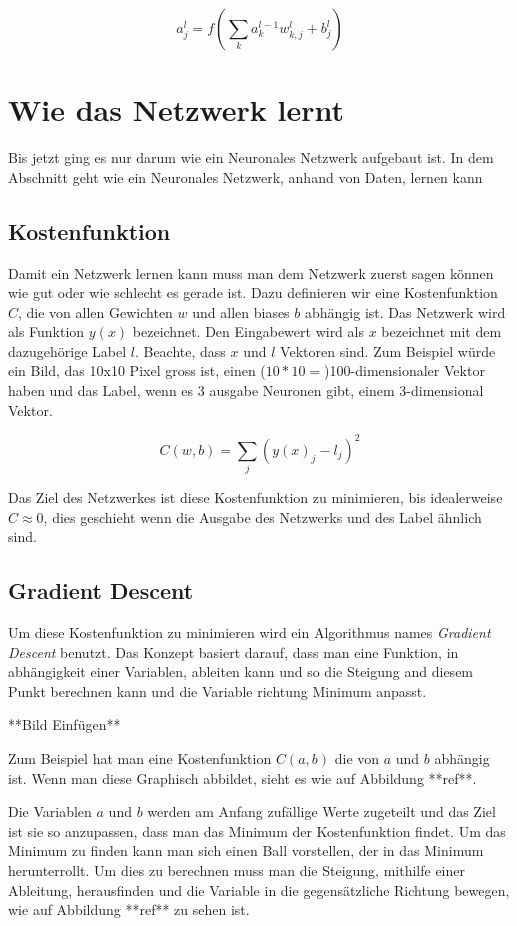 \documentclass[12pt,a4paper]{report}
\begin{document}
\[a^l_j = f\left(\sum_{k} a^{l-1}_k w^l_{k,j} + b^l_j\right)\]

\section{Wie das Netzwerk lernt}\label{sec:lernen}
Bis jetzt ging es nur darum wie ein Neuronales Netzwerk aufgebaut ist.
In dem Abschnitt geht wie ein Neuronales Netzwerk, anhand von Daten, lernen kann
\subsection{Kostenfunktion}
Damit ein Netzwerk lernen kann muss man dem Netzwerk zuerst sagen können wie gut oder wie schlecht es gerade ist.
Dazu definieren wir eine Kostenfunktion $C$, die von allen Gewichten $w$ und allen biases $b$ abhängig ist.
Das Netzwerk wird als Funktion $y(x)$ bezeichnet.
Den Eingabewert wird als $x$ bezeichnet mit dem dazugehörige Label $l$.
Beachte, dass $x$ und $l$ Vektoren sind.
Zum Beispiel würde ein Bild, das 10x10 Pixel gross ist, einen ($10 * 10 =$)100-dimensionaler Vektor haben
und das Label, wenn es 3 ausgabe Neuronen gibt, einem 3-dimensional Vektor.

\[C(w,b) = \sum_{j}(y(x)_j - l_j)^2\]

Das Ziel des Netzwerkes ist diese Kostenfunktion zu minimieren, bis idealerweise $C \approx 0$,
dies geschieht wenn die Ausgabe des Netzwerks und des Label ähnlich sind.
\subsection{Gradient Descent}
Um diese Kostenfunktion zu minimieren wird ein Algorithmus names \textit{Gradient Descent} benutzt.
Das Konzept basiert darauf, dass man eine Funktion, in abhängigkeit einer Variablen, ableiten kann und so die Steigung
and diesem Punkt berechnen kann und die Variable richtung Minimum anpasst.

**Bild Einfügen**

Zum Beispiel hat man eine Kostenfunktion $C(a,b)$ die von $a$ und $b$ abhängig ist.
Wenn man diese Graphisch abbildet, sieht es wie auf Abbildung **ref**.

Die Variablen $a$ und $b$ werden am Anfang zufällige Werte zugeteilt und das Ziel ist sie so anzupassen,
dass man das Minimum der Kostenfunktion findet.
Um das Minimum zu finden kann man sich einen Ball vorstellen, der in das Minimum herunterrollt.
Um dies zu berechnen muss man die Steigung, mithilfe einer Ableitung, herausfinden und die Variable in die
gegensätzliche Richtung bewegen, wie auf Abbildung **ref** zu sehen ist.
\end{document}
